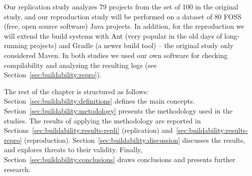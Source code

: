Our replication study analyzes 79 projects from the set of 100 in the original study, and our reproduction study will be performed on a dataset of 80 FOSS (free, open source software) Java projects. In addition, for the reproduction we will extend the build systems with Ant (very popular in the old days of long-running projects) and Gradle (a newer build tool) -- the original study only considered Maven. In both studies we used our own software for checking compilability and analyzing the resulting logs (see Section~\ref{sec:buildability:repro}).












The rest of the chapter is structured as follows:
Section~\ref{sec:buildability:definitions} defines the main concepts.
Section~\ref{sec:buildability:metodology} presents the methodology used in the studies. 
The results of applying the methodology are reported in Sections~\ref{sec:buildability:results-repli} (replication) and~\ref{sec:buildability:results-repro} (reproduction).
Section~\ref{sec:buildability:discussion} discusses the results, and explores threats to their validity.
Finally, Section~\ref{sec:buildability:conclusions} draws conclusions and presents further research.

